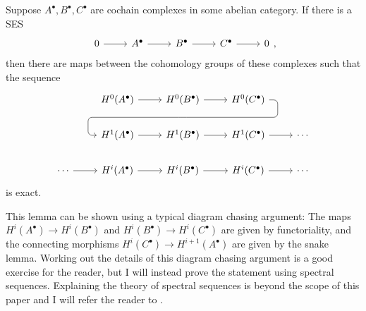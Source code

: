 \begin{lemm}
  Suppose $A^{\bullet},B^{\bullet},C^{\bullet}$ are cochain complexes in some
  abelian category. If there is a SES
  \[\begin{tikzcd}
      0\rar & A^{\bullet}\rar & B^{\bullet}\rar & C^{\bullet}\rar & 0
    \end{tikzcd},\]
  then there are maps between the cohomology groups of these complexes
  such that the sequence
  \[\begin{tikzcd}
    & H^{0}(A^{\bullet}) \rar & H^{0}(B^{\bullet})
    \rar\dar[phantom, ""{coordinate, name=Z}] & H^{0}(C^{\bullet})
    \arrow[rounded corners, to path={ -- ([xshift=2ex]\tikztostart.east)
      |- (Z) -| ([xshift=-2ex]\tikztotarget.west) -- (\tikztotarget)},
    overlay]{dll} & \\
    & H^{1}(A^{\bullet}) \rar & H^{1}(B^{\bullet})\rar
    & H^{1}(C^{\bullet}) \rar & \cdots \\
    \cdots \rar& H^{i}(A^{\bullet}) \rar & H^{i}(B^{\bullet})\rar
    & H^{i}(C^{\bullet}) \rar & \cdots
    \end{tikzcd}\]
  is exact.
\end{lemm}
This lemma can be shown using a typical diagram chasing argument: The maps
$H^{i}(A^{\bullet})\to H^{i}(B^{\bullet})$ and
$H^{i}(B^{\bullet})\to H^{i}(C^{\bullet})$ are given by functoriality, and the
connecting morphisms $H^{i}(C^{\bullet})\to H^{i+1}(A^{\bullet})$ are given by
the snake lemma. Working out the details of this diagram chasing argument is
a good exercise for the reader, but I will instead prove the statement using
spectral sequences. Explaining the theory of spectral sequences is beyond
the scope of this paper and I will refer the reader to
\cite[section 1.7]{vakil}.

